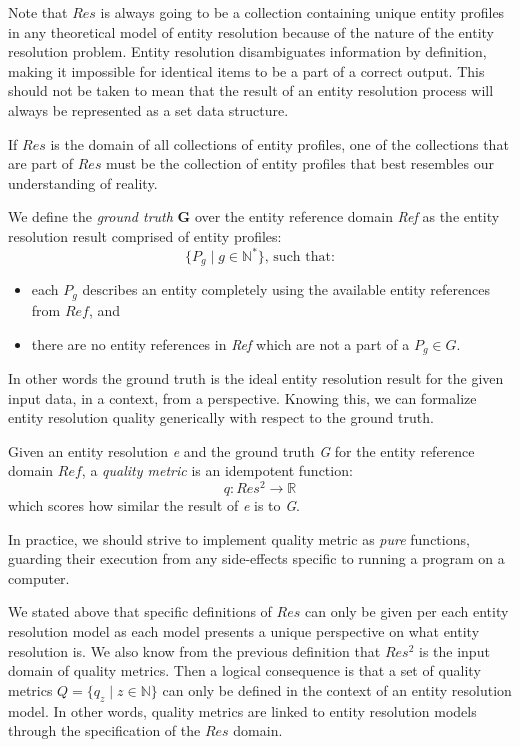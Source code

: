 Note that $Res$ is always going to be a collection containing unique entity
profiles in any theoretical model of entity resolution because of the nature
of the entity resolution problem.
Entity resolution disambiguates information by definition, making it impossible
for identical items to be a part of a correct output.
This should not be taken to mean that the result of an entity resolution process
will always be represented as a set data structure.

If $Res$ is the domain of all collections of entity profiles, one of
the collections that are part of $Res$ must be the collection of entity
profiles that best resembles our understanding of reality.

\begin{defn}
    We define the \textit{ground truth} \textbf{G} over the entity reference
    domain \textit{Ref} as the entity resolution result comprised of entity
    profiles:
    \[
        \{P_g \mid g \in \mathbb{N^*}\}\textrm{, such that:}
    \]
    \begin{itemize}
        \item each $P_g$ describes an entity completely using the available
        entity references from $Ref$, and
        \item there are no entity references in \textit{Ref} which are not a
        part of a $P_g \in G$.
    \end{itemize}
\end{defn}

In other words the ground truth is the ideal entity resolution result for 
the given input data, in a context, from a perspective.
Knowing this, we can formalize entity resolution quality generically with
respect to the ground truth.

\begin{defn}
Given an entity resolution \textit{e} and the ground truth \textit{G} for
the entity reference domain $Ref$, a \textit{quality metric} is an
idempotent function:
\[
    q: Res^2 \rightarrow \mathbb{R}
\]
which scores how similar the result of \textit{e} is to \textit{G}.
\end{defn}

In practice, we should strive to implement quality metric as \textit{pure}
functions, guarding their execution from any side-effects specific to
running a program on a computer.

We stated above that specific definitions of $Res$ can only be given per each
entity resolution model as each model presents a unique perspective on what
entity resolution is.
We also know from the previous definition that $Res^2$ is the input domain of
quality metrics.
Then a logical consequence is that a set of quality metrics
$Q = \{q_z \mid z \in \mathbb{N}\}$ can only be defined in the context of an
entity resolution model.
In other words, quality metrics are linked to entity resolution models through
the specification of the $Res$ domain.

